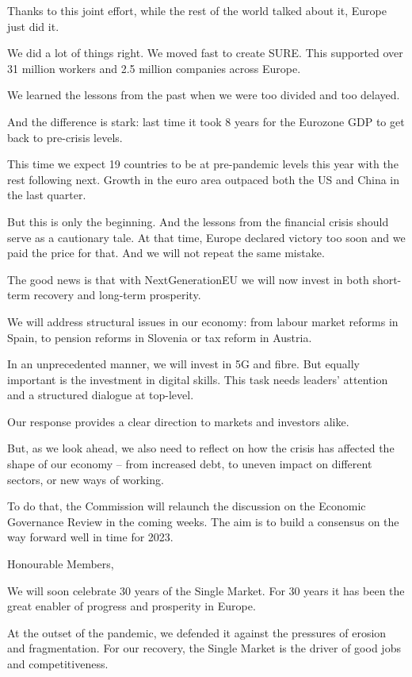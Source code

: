 \documentclass[a4paper,11pt]{article}
\begin{document}
Thanks to this joint effort, while the rest of the world talked about it, Europe just did it.

We did a lot of things right. We moved fast to create SURE. This supported over 31 million workers and 2.5 million companies across Europe.

We learned the lessons from the past when we were too divided and too delayed.

And the difference is stark: last time it took 8 years for the Eurozone GDP to get back to pre-crisis levels. 

This time we expect 19 countries to be at pre-pandemic levels this year with the rest following next. Growth in the euro area outpaced both the US and China in the last quarter.

But this is only the beginning. And the lessons from the financial crisis should serve as a cautionary tale. At that time, Europe declared victory too soon and we paid the price for that. And we will not repeat the same mistake.

The good news is that with NextGenerationEU we will now invest in both short-term recovery and long-term prosperity.

We will address structural issues in our economy: from labour market reforms in Spain, to pension reforms in Slovenia or tax reform in Austria.

In an unprecedented manner, we will invest in 5G and fibre. But equally important is the investment in digital skills. This task needs leaders' attention and a structured dialogue at top-level.

Our response provides a clear direction to markets and investors alike.

But, as we look ahead, we also need to reflect on how the crisis has affected the shape of our economy – from increased debt, to uneven impact on different sectors, or new ways of working.

To do that, the Commission will relaunch the discussion on the Economic Governance Review in the coming weeks. The aim is to build a consensus on the way forward well in time for 2023.

 

 

 

Honourable Members,

We will soon celebrate 30 years of the Single Market. For 30 years it has been the great enabler of progress and prosperity in Europe.

At the outset of the pandemic, we defended it against the pressures of erosion and fragmentation. For our recovery, the Single Market is the driver of good jobs and competitiveness.
\end{document}
